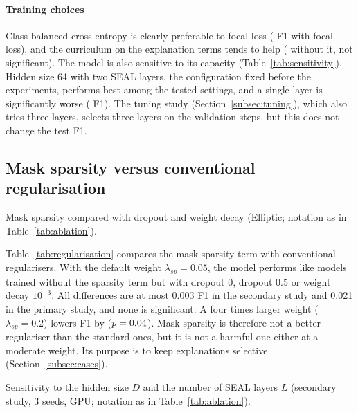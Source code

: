 \paragraph{Training choices} Class-balanced cross-entropy is clearly preferable to focal loss (\ablGfocallossDelta{} F1 with focal loss), and the curriculum on the explanation terms tends to help (\ablGnocurriculumDelta{} without it, not significant). The model is also sensitive to its capacity (Table~\ref{tab:sensitivity}). Hidden size 64 with two SEAL layers, the configuration fixed before the experiments, performs best among the tested settings, and a single layer is significantly worse (\sensGlayersOneDelta{} F1). The tuning study (Section~\ref{subsec:tuning}), which also tries three layers, selects three layers on the validation steps, but this does not change the test F1.

\subsection{Mask sparsity versus conventional regularisation}
\label{subsec:regularisation}

\begin{table}[!t]
\centering
\caption{Mask sparsity compared with dropout and weight decay (Elliptic; notation as in Table~\ref{tab:ablation}).}
\label{tab:regularisation}
\footnotesize
\begin{adjustbox}{max width=\textwidth}\end{adjustbox}
\end{table}

Table~\ref{tab:regularisation} compares the mask sparsity term with conventional regularisers. With the default weight $\lambda_{sp}=0.05$, the model performs like models trained without the sparsity term but with dropout 0, dropout 0.5 or weight decay $10^{-3}$. All differences are at most 0.003 F1 in the secondary study and 0.021 in the primary study, and none is significant. A four times larger weight ($\lambda_{sp}=0.2$) lowers F1 by \regGsparsityxFourDelta{} ($p=0.04$). Mask sparsity is therefore not a better regulariser than the standard ones, but it is not a harmful one either at a moderate weight. Its purpose is to keep explanations selective (Section~\ref{subsec:cases}).

\begin{table}[!t]
\centering
\caption{Sensitivity to the hidden size $D$ and the number of SEAL layers $L$ (secondary study, 3 seeds, GPU; notation as in Table~\ref{tab:ablation}).}
\label{tab:sensitivity}
\footnotesize
\begin{adjustbox}{max width=\textwidth}\end{adjustbox}
\end{table}

